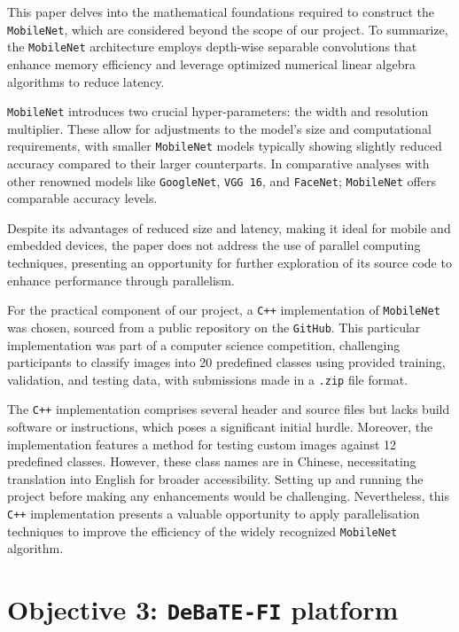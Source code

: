 This paper\cite{mobilenet_paper} delves into the mathematical foundations required to construct the \texttt{MobileNet}, which are considered beyond the scope of our project. To summarize, the \texttt{MobileNet} architecture employs depth-wise separable convolutions that enhance memory efficiency and leverage optimized numerical linear algebra algorithms to reduce latency.

\texttt{MobileNet} introduces two crucial hyper-parameters: the width and resolution multiplier. These allow for adjustments to the model's size and computational requirements, with smaller \texttt{MobileNet} models typically showing slightly reduced accuracy compared to their larger counterparts. In comparative analyses with other renowned models like \texttt{GoogleNet}, \texttt{VGG 16}, and \texttt{FaceNet}; \texttt{MobileNet} offers comparable accuracy levels.

Despite its advantages of reduced size and latency, making it ideal for mobile and embedded devices, the paper\cite{mobilenet_paper} does not address the use of parallel computing techniques, presenting an opportunity for further exploration of its source code to enhance performance through parallelism.

For the practical component of our project, a \texttt{C++} implementation of \texttt{MobileNet} was chosen, sourced from a public repository on the \texttt{GitHub}\cite{mobilenet_repo}. This particular implementation was part of a computer science competition\cite{mobilenet_competition}, challenging participants to classify images into 20 predefined classes using provided training, validation, and testing data, with submissions made in a \texttt{.zip} file format.

The \texttt{C++} implementation comprises several header and source files but lacks build software or instructions, which poses a significant initial hurdle. Moreover, the implementation features a method for testing custom images against 12 predefined classes. However, these class names are in Chinese, necessitating translation into English for broader accessibility. Setting up and running the project before making any enhancements would be challenging. Nevertheless, this \texttt{C++} implementation presents a valuable opportunity to apply parallelisation techniques to improve the efficiency of the widely recognized \texttt{MobileNet} algorithm.

\section{Objective 3: \texttt{DeBaTE-FI} platform}

